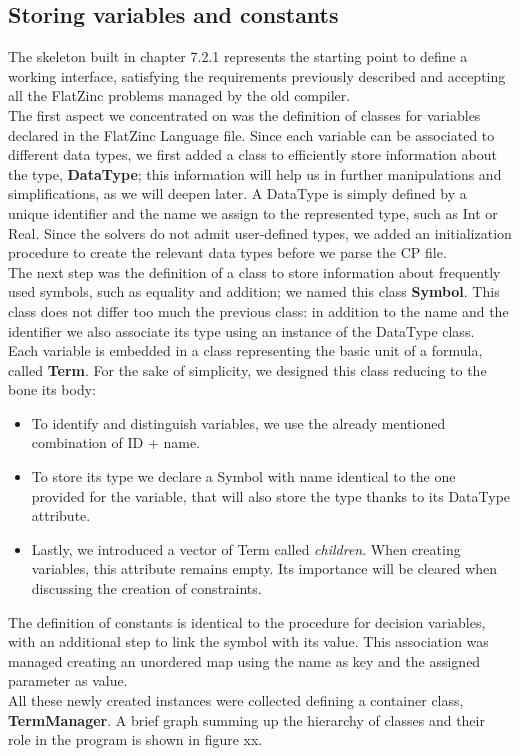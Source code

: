 \subsection{Storing variables and constants}

The skeleton built in chapter 7.2.1 represents the starting point to define a working interface, satisfying the requirements previously described and accepting all the FlatZinc problems managed by the old compiler. \\
The first aspect we concentrated on was the definition of classes for variables declared in the FlatZinc Language file. Since each variable can be associated to different data types, we first added a class to efficiently store information about the type, \textbf{DataType}; this information will help us in further manipulations and simplifications, as we will deepen later. A DataType is simply defined by a unique identifier and the name we assign to the represented type, such as Int or Real. Since the solvers do not admit user-defined types, we added an initialization procedure to create the relevant data types before we parse the CP file. \\
The next step was the definition of a class to store information about frequently used symbols, such as equality and addition; we named this class \textbf{Symbol}. This class does not differ too much the previous class: in addition to the name and the identifier we also associate its type using an instance of the DataType class.\\
Each variable is embedded in a class representing the basic unit of a formula, called \textbf{Term}. For the sake of simplicity, we designed this class reducing to the bone its body:

\begin{itemize}
    \item To identify and distinguish variables, we use the already mentioned combination of ID + name.
    \item To store its type we declare a Symbol with name identical to the one provided for the variable, that will also store the type thanks to its DataType attribute.
    \item Lastly, we introduced a vector of Term called \textit{children}. When creating variables, this attribute remains empty. Its importance will be cleared when discussing the creation of constraints.
\end{itemize}

The definition of constants is identical to the procedure for decision variables, with an additional step to link the symbol with its value. This association was managed creating an unordered map using the name as key and the assigned parameter as value. \\
All these newly created instances were collected defining a container class, \textbf{TermManager}.
A brief graph summing up the hierarchy of classes and their role in the program is shown in figure xx. 

